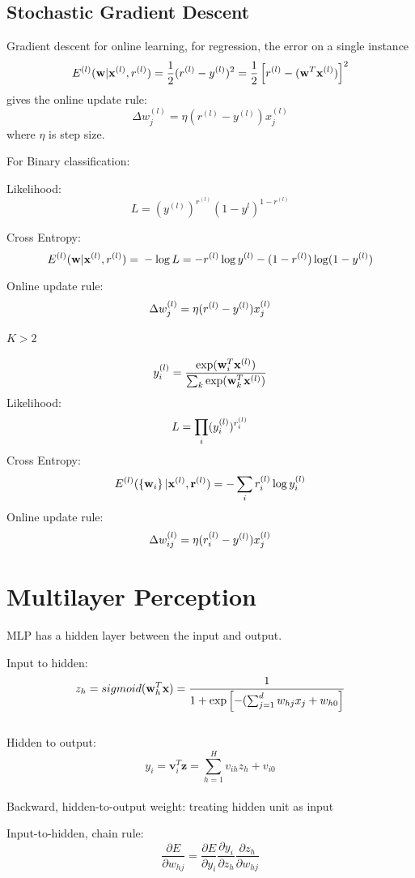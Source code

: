     \subsection{Stochastic Gradient Descent} 
        
        Gradient descent for online learning, for regression, the error on a
        single instance \[E^{(l)}(\mathbf{w}|\mathbf{x}^{(l)}, r^{(l)}) =
        \frac{1}{2}(r^{(l)} - y^{(l)})^2 = \frac{1}{2}\left[ r^{(l)}-(\mathbf{w}^T\mathbf{x}^{(l)})
        \right]^2\] 
        gives the online update rule: 
        \[\Delta w_j^{(l)} =
        \eta(r^{(l)}-y^{(l)})x_j^{(l)}\] 
        where $\eta$ is step size.

        For Binary classification:

        Likelihood: \[L = (y^{(l)})^{r^{(l)}}(1-y^{l})^{1-r^{(l)}}\]

        Cross Entropy: \[E^{(l)} (\mathbf{w}|\mathbf{x}^{(l)}, r^{(l)}) =\\ -\log L = -r^{(l)}\log y^{(l)} -
        (1-r^{(l)})\log(1-y^{(l)})\]

        Online update rule: \[\Delta w_j^{(l)} = \eta(r^{(l)} -
        y^{(l)})x_j^{(l)}\]

    \paragraph{$K>2$} 
    \[y^{(l)}_i = \frac{\exp(\mathbf{w}_i^T\mathbf{x}^{(l)})}{\sum_k \exp(\mathbf{w}_k^T\mathbf{x}^{(l)})}\]
        Likelihood: \[L = \prod_i(y_i^{(l)})^{r^{(l)}_i}\]
        Cross Entropy: \[E^{(l)}(\left\{ \mathbf{w}_i\right\}|\mathbf{x}^{(l)},\mathbf{r}^{(l)} ) =
        -\sum_i r^{(l)}_i\log y^{(l)}_i\] 
        Online update rule: \[\Delta w_{ij}^{(l)} =
        \eta(r^{(l)}_i-y^{(l)})x_j^{(l)}\]
    \section{Multilayer Perception} MLP has a hidden layer between the input and
        output.

        Input to hidden: 
        \[z_h = sigmoid(\mathbf{w}_h^T\mathbf{x}) = \frac{1}{1+\exp\left[
            -(\sum_{j=1}^d w_{hj}x_j + w_{h0}
        \right]}\]\\

        Hidden to output: \[y_i = \mathbf{v}_i^T\mathbf{z} =
        \sum_{h=1}^Hv_{ih}z_h + v_{i0}\]\\

        Backward, hidden-to-output weight: treating hidden unit as input

        Input-to-hidden, chain rule: \[\frac{\partial E}{\partial w_{hj}} =
        \frac{\partial E}{\partial y_i} \frac{\partial y_i}{\partial
        z_h}\frac{\partial z_h}{\partial w_{hj}}\]

